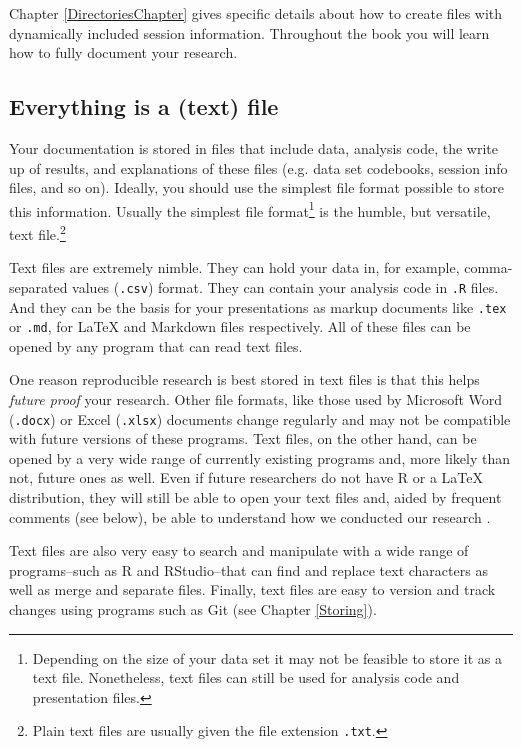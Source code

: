 {\noindent Chapter \ref{DirectoriesChapter} gives specific details about how to create files with dynamically included session information. Throughout the book you will learn how to fully document your research.

\subsection{Everything is a (text) file}

Your documentation is stored in files that include data, analysis code, the write up of results, and explanations of these files (e.g. data set codebooks, session info files, and so on). Ideally, you should use the simplest file format possible to store this information. Usually the simplest file format\footnote{Depending on the size of your data set it may not be feasible to store it as a text file. Nonetheless, text files can still be used for analysis code and presentation files.}  is the humble, but versatile, text file.\footnote{Plain text files are usually given the file extension \texttt{.txt}.}

Text files are extremely nimble. They can hold your data in, for example, comma-separated values ({\tt{.csv}})  format. They can contain your analysis code in {\tt{.R}} files. And they can be the basis for your presentations as markup documents like {\tt{.tex}} or {\tt{.md}}, for LaTeX and Markdown files respectively. All of these files can be opened by any program that can read text files. 

One reason reproducible research is best stored in text files is that this helps {\emph{future proof}} your research. Other file formats, like those used by Microsoft Word  (\texttt{.docx}) or Excel (\texttt{.xlsx}) documents change regularly and may not be compatible with future versions of these programs. Text files, on the other hand, can be opened by a very wide range of currently existing programs and, more likely than not, future ones as well. Even if future researchers do not have R or a LaTeX distribution, they will still be able to open your text files and, aided by frequent comments (see below), be able to understand how we conducted our research \cite[3]{Bowers2011}.

Text files are also very easy to search and manipulate with a wide range of programs--such as R and RStudio--that can find and replace text characters as well as merge and separate files. Finally, text files are easy to version and track changes using programs such as Git (see Chapter \ref{Storing}).   

}

